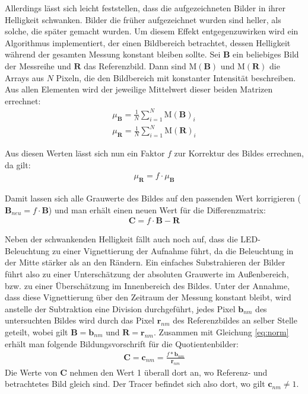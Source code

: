 Allerdings lässt sich leicht feststellen, dass die aufgezeichneten Bilder in ihrer Helligkeit schwanken. Bilder die früher aufgezeichnet wurden sind heller, als solche, die später gemacht wurden. Um diesem Effekt entgegenzuwirken wird ein Algorithmus implementiert, der einen Bildbereich betrachtet, dessen Helligkeit während der gesamten Messung konstant bleiben sollte. Sei $\mathbf{B}$ ein beliebiges Bild der Messreihe und $\mathbf{R}$ das Referenzbild. Dann sind $\mathrm{M(\mathbf{B})}$ und $\mathrm{M(\mathbf{R})}$ die Arrays aus $N$ Pixeln, die den Bildbereich mit konstanter Intensität beschreiben. Aus allen Elementen wird der jeweilige Mittelwert dieser beiden Matrizen errechnet:
\begin{eqnarray}
 \mu_{\mathbf{B}} = \frac{1}{N} \sum_{i=1}^N \mathrm{M(\mathbf{B})}_i \\
 \mu_{\mathbf{R}} = \frac{1}{N} \sum_{i=1}^N \mathrm{M(\mathbf{R})}_i
\end{eqnarray}

Aus diesen Werten lässt sich nun ein Faktor $f$ zur Korrektur des Bildes errechnen, da gilt:
\begin{eqnarray}
 \mu_{\mathbf{R}} = f \cdot \mu_{\mathbf{B}}
\end{eqnarray}

Damit lassen sich alle Grauwerte des Bildes auf den passenden Wert korrigieren ($\mathbf{B}_{neu} = f \cdot \mathbf{B}$) und man erhält einen neuen Wert für die Differenzmatrix:
\begin{eqnarray}
 \mathbf{C} = f \cdot \mathbf{B} - \mathbf{R}
 \label{eq:norm}
\end{eqnarray}


Neben der schwankenden Helligkeit fällt auch noch auf, dass die LED-Beleuchtung zu einer Vignettierung der Aufnahme führt, da die Beleuchtung in der Mitte stärker als an den Rändern. Ein einfaches Substrahieren der Bilder führt also zu einer Unterschätzung der absoluten Grauwerte im Außenbereich, bzw. zu einer Überschätzung im Innenbereich des Bildes.
Unter der Annahme, dass diese Vignettierung über den Zeitraum der Messung konstant bleibt, wird anstelle der Subtraktion eine Division durchgeführt, \dah jedes Pixel $\mathbf{b}_{nm}$ des untersuchten Bildes wird durch das Pixel $\mathbf{r}_{nm}$ des Referenzbildes an selber Stelle geteilt, wobei gilt $\mathbf{B} = \mathbf{b}_{nm}$ und $\mathbf{R} = \mathbf{r}_{nm}$. Zusammen mit Gleichung \ref{eq:norm} erhält man folgende Bildungsvorschrift für die Quotientenbilder:
\begin{eqnarray}
 \mathbf{C} = \mathbf{c}_{nm} = \frac{f * \mathbf{b}_{nm}}{\mathbf{r}_{nm}}
 \label{eq:quot}
\end{eqnarray}
Die Werte von $\mathbf{C}$ nehmen den Wert 1 überall dort an, wo Referenz- und betrachtetes Bild gleich sind. Der Tracer befindet sich also dort, wo gilt $\mathbf{c}_{nm} \neq 1$.

